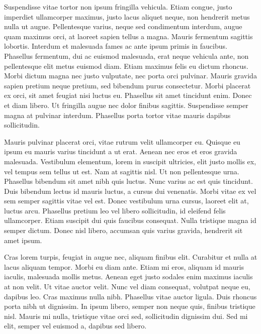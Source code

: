 Suspendisse vitae tortor non ipsum fringilla vehicula. Etiam congue, justo imperdiet ullamcorper maximus, justo lacus aliquet neque, non hendrerit metus nulla ut augue. Pellentesque varius, neque sed condimentum interdum, augue quam maximus orci, at laoreet sapien tellus a magna. Mauris fermentum sagittis lobortis. Interdum et malesuada fames ac ante ipsum primis in faucibus. Phasellus fermentum, dui ac euismod malesuada, erat neque vehicula ante, non pellentesque elit metus euismod diam. Etiam maximus felis eu dictum rhoncus. Morbi dictum magna nec justo vulputate, nec porta orci pulvinar. Mauris gravida sapien pretium neque pretium, sed bibendum purus consectetur. Morbi placerat ex orci, sit amet feugiat nisi luctus eu. Phasellus sit amet tincidunt enim. Donec et diam libero. Ut fringilla augue nec dolor finibus sagittis. Suspendisse semper magna at pulvinar interdum. Phasellus porta tortor vitae mauris dapibus sollicitudin.

Mauris pulvinar placerat orci, vitae rutrum velit ullamcorper eu. Quisque eu ipsum eu mauris varius tincidunt a ut erat. Aenean nec eros et eros gravida malesuada. Vestibulum elementum, lorem in suscipit ultricies, elit justo mollis ex, vel tempus sem tellus ut est. Nam at sagittis nisl. Ut non pellentesque urna. Phasellus bibendum sit amet nibh quis luctus. Nunc varius ac est quis tincidunt. Duis bibendum lectus id mauris luctus, a cursus dui venenatis. Morbi vitae ex vel sem semper sagittis vitae vel est. Donec vestibulum urna cursus, laoreet elit at, luctus arcu. Phasellus pretium leo vel libero sollicitudin, id eleifend felis ullamcorper. Etiam suscipit dui quis faucibus consequat. Nulla tristique magna id semper dictum. Donec nisl libero, accumsan quis varius gravida, hendrerit sit amet ipsum.

Cras lorem turpis, feugiat in augue nec, aliquam finibus elit. Curabitur et nulla at lacus aliquam tempor. Morbi eu diam ante. Etiam mi eros, aliquam id mauris iaculis, malesuada mollis metus. Aenean eget justo sodales enim maximus iaculis at non velit. Ut vitae auctor velit. Nunc vel diam consequat, volutpat neque eu, dapibus leo. Cras maximus nulla nibh. Phasellus vitae auctor ligula. Duis rhoncus porta nibh ut dignissim. In ipsum libero, semper non neque quis, finibus tristique nisl. Mauris mi nulla, tristique vitae orci sed, sollicitudin dignissim dui. Sed mi elit, semper vel euismod a, dapibus sed libero.